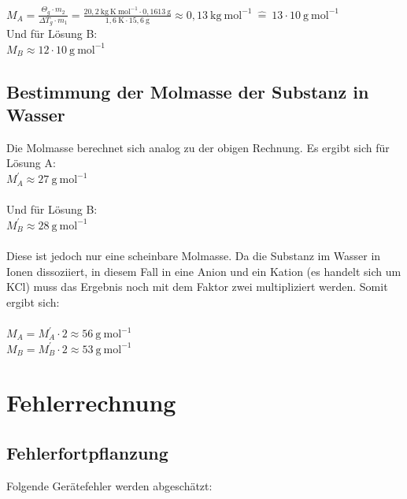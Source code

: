 \documentclass[12pt,a4paper,titlepage,headinclude,bibtotoc]{scrartcl}
\begin{document}
$M_A = \frac {\Theta _g \cdot m_2 }{ \Delta T_g\cdot m_1} 
 = \frac {20,2{~} \mathrm{kg{~}K {~} mol^{-1}} \cdot 0,1613 {~}\text{g}} { 1,6 {~} \mathrm{K} \cdot 15,6{~} \mathrm{g}} \approx 0,13{~} \mathrm{kg {~} mol^{-1}} {~}\widehat{=}{~} 13 \cdot 10{~} \mathrm{g{~}mol^{-1}} $\\

Und für Lösung B:\\

$M_B \approx 12 \cdot 10{~} \mathrm{g{~}mol^{-1}}$


\subsection{Bestimmung der Molmasse der Substanz in Wasser}

Die Molmasse berechnet sich analog zu der obigen Rechnung. Es ergibt sich für Lösung A:\\
$M_A^{'} \approx 27{~} \mathrm{g{~}mol^{-1}}$\\\\
Und für Lösung B:\\
$M_B^{'} \approx 28{~} \mathrm{g{~}mol^{-1}}$\\\\

Diese ist jedoch nur eine scheinbare Molmasse. Da die Substanz im Wasser in Ionen dissoziiert, in diesem Fall in eine Anion und ein Kation (es handelt sich um KCl) muss das Ergebnis noch mit dem Faktor zwei multipliziert werden. Somit ergibt sich:\\\\
$M_A = M_A^{'} \cdot 2 \approx 56{~} \mathrm{g{~}mol^{-1}} $\\
$M_B = M_B^{'} \cdot 2 \approx 53{~} \mathrm{g{~}mol^{-1}} $\\

\section{Fehlerrechnung}
\subsection{Fehlerfortpflanzung}
Folgende Gerätefehler werden abgeschätzt:\\
\end{document}
